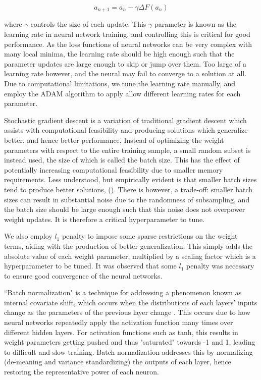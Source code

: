 \documentclass[11pt, a4paper, table]{article}
\begin{document}
\begin{equation}
	a_{n+1} = a_n - \gamma \Delta F(a_n)
\end{equation}

where $\gamma$ controls the size of each update. This $\gamma$ parameter is known as the learning rate in neural network training, and controlling this is critical for good performance. As the loss functions of neural networks can be very complex with many local minima, the learning rate should be high enough such that the parameter updates are large enough to skip or jump over them. Too large of a learning rate however, and the neural may fail to converge to a solution at all. Due to computational limitations, we tune the learning rate manually, and employ the ADAM algorithm to apply allow different learning rates for each parameter.

Stochastic gradient descent is a variation of traditional gradient descent which assists with computational feasibility and producing solutions which generalize better, and hence better performance. Instead of optimizing the weight parameters with respect to the entire training sample, a small random subset is instead used, the size of which is called the batch size. This has the effect of potentially increasing computational feasibility due to smaller memory requirements. Less understood, but empirically evident is that smaller batch sizes tend to produce better solutions, (\cite{keskar_large-batch_2016}). There is however, a trade-off: smaller batch sizes can result in substantial noise due to the randomness of subsampling, and the batch size should be large enough such that this noise does not overpower weight updates. It is therefore a critical hyperparameter to tune.

We also employ $l_1$ penalty to impose some sparse restrictions on the weight terms, aiding with the production of better generalization. This simply adds the absolute value of each weight parameter, multiplied by a scaling factor which is a hyperparameter to be tuned. It was observed that some $l_1$ penalty was necessary to ensure good convergence of the neural networks.

``Batch normalization" is a technique for addressing a phenomenon known as internal covariate shift, which occurs when the distributions of each layers' inputs change as the parameters of the previous layer change \citep{ioffe_batch_2015}. This occurs due to how neural networks repeatedly apply the activation function many times over different hidden layers. For activation functions such as tanh, this results in weight parameters getting pushed and thus "saturated" towards -1 and 1, leading to difficult and slow training. Batch normalization addresses this by normalizing (de-meaning and variance standardizing) the outputs of each layer, hence restoring the representative power of each neuron.
\end{document}
